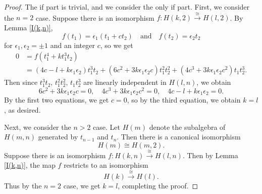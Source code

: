 \documentclass[10pt,a4paper]{amsart}
\begin{document}
\begin{proof}
  The if part is trivial, and we consider the only if part. First, we consider the $n=2$ case. Suppose there is an isomorphism $f\colon H(k,2)\xrightarrow{\cong}H(l,2)$. By Lemma \ref{I(k,n)},
  \[
    f(t_1)=\epsilon_1(t_1+ct_2)\quad\text{and}\quad f(t_2)=\epsilon_2t_2
  \]
  for $\epsilon_1,\epsilon_2=\pm 1$ and an integer $c$, so we get
  \begin{align*}
    0&=f(t_1^4+kt_1^3t_2)\\
    &=(4c-l+k\epsilon_1\epsilon_2)t_1^3t_2+(6c^2+3k\epsilon_1\epsilon_2c)t_1^2t_2^2+(4c^3+3k\epsilon_1\epsilon_2c^2)t_1t_2^3.
  \end{align*}
  Then since $t_1^3t_2,\,t_1^2t_2^2,\,t_1t_2^3$ are linearly independent in $H(l,n)$, we obtain
  \[
    6c^2+3k\epsilon_1\epsilon_2c=0,\quad 4c^3+3k\epsilon_1\epsilon_2c^2=0,\quad 4c-l+k\epsilon_1\epsilon_2=0.
  \]
  By the first two equations, we get $c=0$, so by the third equation, we obtain $k=l$, as desired.



  Next, we consider the $n>2$ case. Let $H(m)$ denote the subalgebra of $H(m,n)$ generated by $t_{n-1}$ and $t_n$. Then there is a canonical isomorphism
  \[
    H(m)\cong H(m,2).
  \]
  Suppose there is an isomorphism $f\colon H(k,n)\xrightarrow{\cong}H(l,n)$. Then by Lemma \ref{I(k,n)}, the map $f$ restricts to an isomorphism
  \[
    H(k)\xrightarrow{\cong}H(l).
  \]
  Thus by the $n=2$ case, we get $k=l$, completing the proof.
\end{proof}
\end{document}
